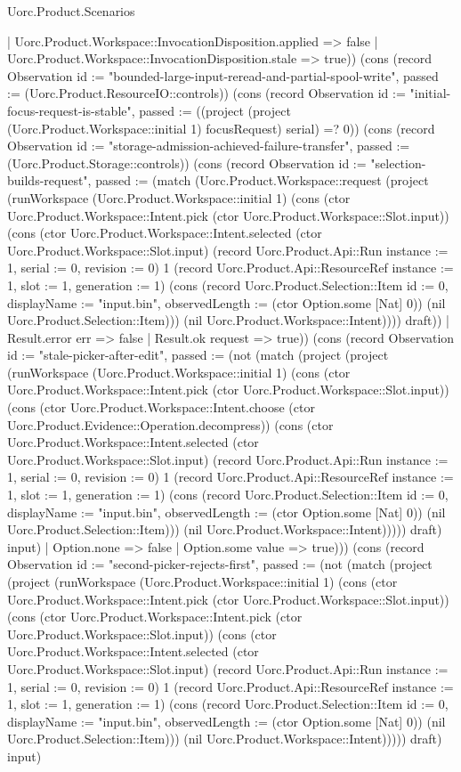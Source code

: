 \begin{lexlean}{Uorc.Product.Scenarios}
\begin{semanticmodule}
{{    | Uorc.Product.Workspace::InvocationDisposition.applied => false
    | Uorc.Product.Workspace::InvocationDisposition.stale => true)}) (cons (record Observation {id := "bounded-large-input-reread-and-partial-spool-write", passed := (Uorc.Product.ResourceIO::controls)}) (cons (record Observation {id := "initial-focus-request-is-stable", passed := ((project (project (Uorc.Product.Workspace::initial 1) focusRequest) serial) =? 0)}) (cons (record Observation {id := "storage-admission-achieved-failure-transfer", passed := (Uorc.Product.Storage::controls)}) (cons (record Observation {id := "selection-builds-request", passed := (match (Uorc.Product.Workspace::request (project (runWorkspace (Uorc.Product.Workspace::initial 1) (cons (ctor Uorc.Product.Workspace::Intent.pick (ctor Uorc.Product.Workspace::Slot.input)) (cons (ctor Uorc.Product.Workspace::Intent.selected (ctor Uorc.Product.Workspace::Slot.input) (record Uorc.Product.Api::Run {instance := 1, serial := 0, revision := 0}) 1 (record Uorc.Product.Api::ResourceRef {instance := 1, slot := 1, generation := 1}) (cons (record Uorc.Product.Selection::Item {id := 0, displayName := "input.bin", observedLength := (ctor Option.some [Nat] 0)}) (nil Uorc.Product.Selection::Item))) (nil Uorc.Product.Workspace::Intent)))) draft))
    | Result.error err => false
    | Result.ok request => true)}) (cons (record Observation {id := "stale-picker-after-edit", passed := (not (match (project (project (runWorkspace (Uorc.Product.Workspace::initial 1) (cons (ctor Uorc.Product.Workspace::Intent.pick (ctor Uorc.Product.Workspace::Slot.input)) (cons (ctor Uorc.Product.Workspace::Intent.choose (ctor Uorc.Product.Evidence::Operation.decompress)) (cons (ctor Uorc.Product.Workspace::Intent.selected (ctor Uorc.Product.Workspace::Slot.input) (record Uorc.Product.Api::Run {instance := 1, serial := 0, revision := 0}) 1 (record Uorc.Product.Api::ResourceRef {instance := 1, slot := 1, generation := 1}) (cons (record Uorc.Product.Selection::Item {id := 0, displayName := "input.bin", observedLength := (ctor Option.some [Nat] 0)}) (nil Uorc.Product.Selection::Item))) (nil Uorc.Product.Workspace::Intent))))) draft) input)
    | Option.none => false
    | Option.some value => true))}) (cons (record Observation {id := "second-picker-rejects-first", passed := (not (match (project (project (runWorkspace (Uorc.Product.Workspace::initial 1) (cons (ctor Uorc.Product.Workspace::Intent.pick (ctor Uorc.Product.Workspace::Slot.input)) (cons (ctor Uorc.Product.Workspace::Intent.pick (ctor Uorc.Product.Workspace::Slot.input)) (cons (ctor Uorc.Product.Workspace::Intent.selected (ctor Uorc.Product.Workspace::Slot.input) (record Uorc.Product.Api::Run {instance := 1, serial := 0, revision := 0}) 1 (record Uorc.Product.Api::ResourceRef {instance := 1, slot := 1, generation := 1}) (cons (record Uorc.Product.Selection::Item {id := 0, displayName := "input.bin", observedLength := (ctor Option.some [Nat] 0)}) (nil Uorc.Product.Selection::Item))) (nil Uorc.Product.Workspace::Intent))))) draft) input)
}}
\end{semanticmodule}
\end{lexlean}

